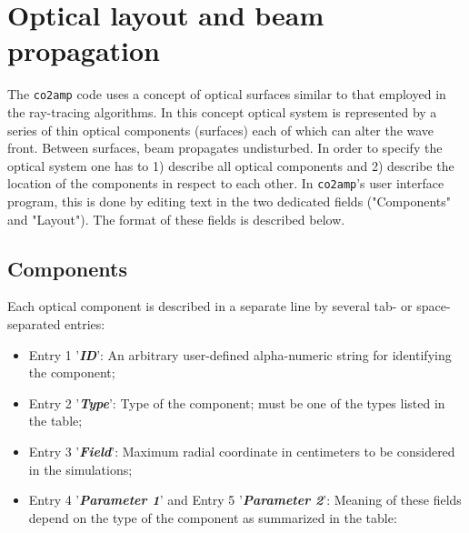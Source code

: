 \documentclass{report}
\begin{document}
\section{Optical layout and beam propagation}
The \texttt{co2amp} code uses a concept of optical surfaces similar to that employed in the ray-tracing algorithms. In this concept optical system is represented by a series of thin optical components (surfaces) each of which can alter the wave front. Between surfaces, beam propagates undisturbed. In order to specify the optical system one has to 1) describe all optical components and 2) describe the location of the components in respect to each other. In \texttt{co2amp}'s user interface program, this is done by editing text in the two dedicated fields ("Components" and "Layout"). The format of these fields is described below.

\subsection{Components}
Each optical component is described in a separate line by several tab- or space- separated entries:

\begin{itemize}
\item Entry 1 '\textit{\textbf{ID}}': An arbitrary user-defined alpha-numeric string for identifying the component;
\item Entry 2 '\textit{\textbf{Type}}': Type of the component; must be one of the types listed in the table;
\item Entry 3 '\textit{\textbf{Field}}':  Maximum radial coordinate in centimeters to be considered in the simulations;
\item Entry 4 '\textit{\textbf{Parameter 1}}' and Entry 5 '\textit{\textbf{Parameter 2}}': Meaning of these fields depend on the type of the component as summarized in the table:
\end{itemize}
\end{document}
